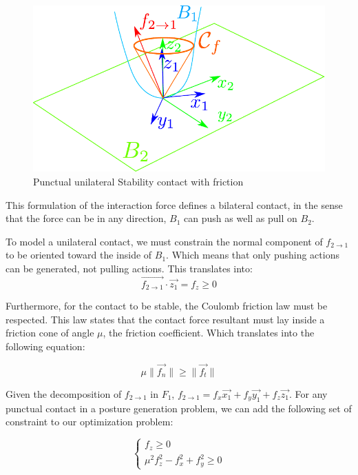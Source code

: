 \begin{figure}[htpb]
  \centering
  \includegraphics[width=0.6\linewidth]{frictionCone.pdf}
  \caption{Punctual unilateral Stability contact with friction}
\label{fig:frictionCone}
\end{figure}

This formulation of the interaction force defines a bilateral contact, in the sense that the force can be in any direction, $B_1$ can push as well as pull on $B_2$.

To model a unilateral contact, we must constrain the normal component of $f_{2\rightarrow 1}$ to be oriented toward the inside of $B_1$. Which means that only pushing actions can be generated, not pulling actions.
This translates into:
\begin{equation}
  \overrightarrow{f_{2\rightarrow 1}}\cdot \vec{z_1} = f_z \geq 0
\end{equation}

Furthermore, for the contact to be stable, the Coulomb friction law must be respected.
This law states that the contact force resultant must lay inside a friction cone of angle $\mu$, the friction coefficient.
Which translates into the following equation:

\begin{equation}
  \mu\|\vec{f_n}\| \geq \|\vec{f_t}\|
\end{equation}

Given the decomposition of $f_{2\rightarrow 1}$ in $F_1$, $f_{2\rightarrow 1} = f_x \vec{x_1} + f_y \vec{y_1} + f_z \vec{z_1}$.
For any punctual contact in a posture generation problem, we can add the following set of constraint to our optimization problem:

\begin{equation}
  \label{eq:unilateralContact}
  \left\{
  \begin{array}{l}
    f_z \geq 0 \\
    \mu^2 f_z^2 - f_x^2 +f_y^2 \geq 0
  \end{array}
  \right.
\end{equation}

